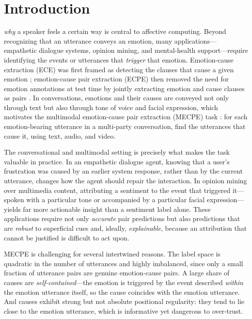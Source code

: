 \documentclass[journal]{IEEEtran}
\begin{document}
\maketitle

\IEEEdisplaynontitleabstractindextext
\IEEEpeerreviewmaketitle

\section{Introduction}
\label{sec:intro}
 \emph{why} a speaker feels a certain way is central
to affective computing. Beyond recognizing that an utterance conveys an emotion,
many applications---empathetic dialogue systems, opinion mining, and mental-health
support---require identifying the events or utterances that \emph{trigger} that
emotion. Emotion-cause extraction (ECE) was first framed as detecting the clauses
that cause a given emotion \cite{lee2010emotion}; emotion-cause pair extraction
(ECPE) then removed the need for emotion annotations at test time by jointly
extracting emotion and cause clauses as pairs \cite{xia2019ecpe}. In conversations,
emotions and their causes are conveyed not only through text but also through tone
of voice and facial expression, which motivates the multimodal emotion-cause pair
extraction (MECPE) task \cite{wang2023mecpe}: for each emotion-bearing utterance in
a multi-party conversation, find the utterances that cause it, using text, audio,
and video.

The conversational and multimodal setting is precisely what makes the task valuable
in practice. In an empathetic dialogue agent, knowing that a user's frustration was
caused by an earlier system response, rather than by the current utterance, changes
how the agent should repair the interaction. In opinion mining over multimedia
content, attributing a sentiment to the event that triggered it---spoken with a
particular tone or accompanied by a particular facial expression---yields far more
actionable insight than a sentiment label alone. These applications require not only
\emph{accurate} pair predictions but also predictions that are \emph{robust} to
superficial cues and, ideally, \emph{explainable}, because an attribution that cannot
be justified is difficult to act upon.

MECPE is challenging for several intertwined reasons. The label space is quadratic
in the number of utterances and highly imbalanced, since only a small fraction of
utterance pairs are genuine emotion-cause pairs. A large share of causes are
\emph{self-contained}---the emotion is triggered by the event described
\emph{within} the emotion utterance itself, so the cause coincides with the emotion
utterance. And causes exhibit strong but not absolute positional regularity: they
tend to lie close to the emotion utterance, which is informative yet dangerous to
over-trust.
\end{document}
